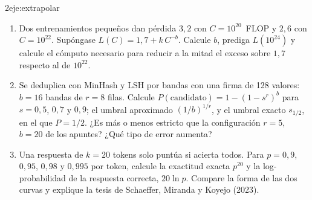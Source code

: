 \begin{ejercicio}{2}{eje:extrapolar}
\begin{enumerate}[label=(\alph*)]
  \item {} Dos entrenamientos pequeños dan pérdida $3{,}2$ con $C=10^{20}$~FLOP y $2{,}6$ con $C=10^{22}$. Supóngase $L(C)=1{,}7+k\,C^{-b}$. Calcule $b$, prediga $L(10^{24})$ y calcule el cómputo necesario para reducir a la mitad el exceso sobre $1{,}7$ respecto al de $10^{22}$.
  \item {} Se deduplica con MinHash y LSH por bandas con una firma de 128 valores: $b=16$ bandas de $r=8$ filas. Calcule $P(\text{candidato})=1-(1-s^{r})^{b}$ para $s=0{,}5$, $0{,}7$ y $0{,}9$; el umbral aproximado $(1/b)^{1/r}$, y el umbral exacto $s_{1/2}$, en el que $P=1/2$. ¿Es más o menos estricto que la configuración $r=5$, $b=20$ de los apuntes? ¿Qué tipo de error aumenta?
  \item {} Una respuesta de $k=20$ tokens solo puntúa si acierta todos. Para $p=0{,}9$, $0{,}95$, $0{,}98$ y $0{,}995$ por token, calcule la exactitud exacta $p^{20}$ y la log-probabilidad de la respuesta correcta, $20\ln p$. Compare la forma de las dos curvas y explique la tesis de Schaeffer, Miranda y Koyejo (2023).
\end{enumerate}
\end{ejercicio}
